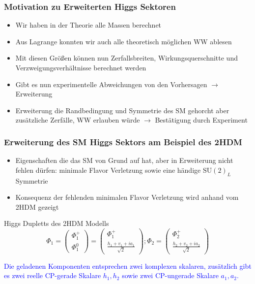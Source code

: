 \documentclass[xcolor=dvipsnames]{beamer}
\begin{document}
\begin{frame}
\frametitle{Motivation zu Erweiterten Higgs Sektoren}
\begin{itemize}
\item Wir haben in der Theorie alle Massen berechnet 
\item Aus Lagrange konnten wir auch alle theoretisch möglichen WW ablesen 
\item Mit diesen Größen können nun Zerfallsbreiten, Wirkungsquerschnitte und Verzweigungsverhältnisse berechnet werden
\item Gibt es nun experimentelle Abweichungen von den Vorhersagen $\rightarrow$ Erweiterung
\item Erweiterung die Randbedingung und Symmetrie des SM gehorcht aber zusätzliche Zerfälle, WW erlauben würde $\rightarrow$ Bestätigung durch Experiment 
\end{itemize}
\end{frame}


\begin{frame}
\frametitle{Erweiterung des SM Higgs Sektors am Beispiel des 2HDM}
\begin{itemize}
\item Eigenschaften die das SM von Grund auf hat, aber in Erweiterung nicht fehlen dürfen: minimale Flavor Verletzung sowie eine händige $\text{SU}(2)_L$ Symmetrie
\item  Konsequenz der fehlenden minimalen Flavor Verletzung wird anhand vom 2HDM gezeigt
\end{itemize}
\begin{block}{Higgs Dupletts des 2HDM Modells }
\begin{equation*}
\Phi_{1}=\left( \begin{array}{c} \Phi^{+}_{1}\\ \Phi^{0}_{1} \end{array}\right)=\left( \begin{array}{c}\Phi^{+}_{1} \\  \frac{h_{1}+v_{1}+ia_{1}}{\sqrt{2}}\end{array}\right) ; \Phi_{2}=\left( \begin{array}{c}\Phi^{+}_{2} \\  \frac{h_{2}+v_{2}+ia_{2}}{\sqrt{2}} \end{array}\right) 
\end{equation*}
\end{block}
\textcolor{Blue}{Die geladenen Komponenten entsprechen zwei komplexen skalaren, zusätzlich gibt es zwei reelle CP-gerade Skalare $h_{1},h_{2}$ sowie zwei CP-ungerade Skalare $a_{1},a_{2}$. }
\end{frame}
\end{document}
